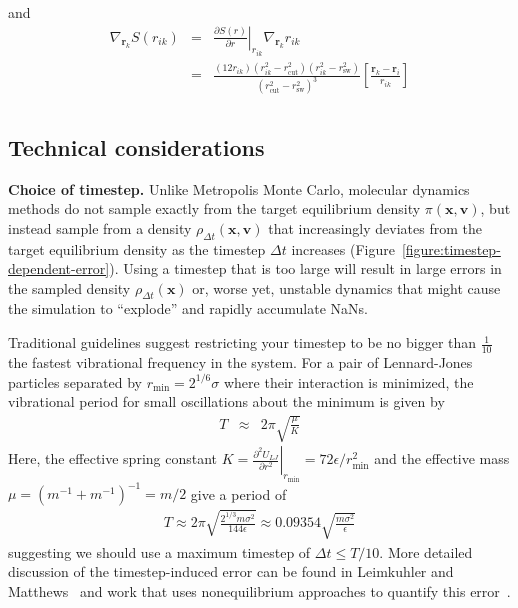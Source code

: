 \documentclass[aip,jcp,preprint,superscriptaddress,floatfix]{revtex4-1}
\newcommand{\x}{\mathbf{x}}
\newcommand{\vel}{\mathbf{v}}
\begin{document}
and
\begin{eqnarray}
\nabla_{\mathbf{r}_k} S(r_{ik}) &=& \left. \frac{\partial S(r)}{\partial r} \right|_{r_{ik}} \nabla_{\mathbf{r}_k} r_{ik}  \\
&=&\frac{(12 r_{ik}) (r_{ik}^2 - r_\mathrm{cut}^2) (r_{ik}^2 - r_\mathrm{sw}^2)}{(r_\mathrm{cut}^2 - r_\mathrm{sw}^2)^3} \left[ \frac{\mathbf{r}_k - \mathbf{r}_i}{r_{ik}} \right] \\
\end{eqnarray}

\subsection{Technical considerations}


\textbf{Choice of timestep.} 
Unlike Metropolis Monte Carlo, molecular dynamics methods do not sample exactly from the target equilibrium density $\pi(\x,\vel)$, but instead sample from a density $\rho_{\Delta t}(\x,\vel)$ that increasingly deviates from the target equilibrium density as the timestep $\Delta t$ increases (Figure~\ref{figure:timestep-dependent-error}).
Using a timestep that is too large will result in large errors in the sampled density $\rho_{\Delta t}(\x)$ or, worse yet, unstable dynamics that might cause the simulation to ``explode''  and rapidly accumulate NaNs.

Traditional guidelines suggest restricting your timestep to be no bigger than $\frac{1}{10}$ the fastest vibrational frequency in the system.
For a pair of Lennard-Jones particles separated by $r_\mathrm{min} = 2^{1/6} \sigma$ where their interaction is minimized, the vibrational period for small oscillations about the minimum is given by
\begin{eqnarray}
T &\approx& 2 \pi \sqrt{ \frac{\mu}{K} } 
\end{eqnarray}
Here, the effective spring constant $K = \left. \frac{\partial^2 U_{LJ}}{\partial r^2} \right|_{r_\mathrm{min}} = 72 \epsilon / r_\mathrm{min}^2$ and the effective mass $\mu = (m^{-1} + m^{-1})^{-1} = m/2$ give a period of 
\begin{eqnarray}
T \approx 2 \pi \sqrt{\frac{2^{1/3} m \sigma^2}{144 \epsilon}} \approx 0.09354 \sqrt{\frac{m \sigma^2}{\epsilon}}
\end{eqnarray}
suggesting we should use a maximum timestep of $\Delta t \le T/10$.
More detailed discussion of the timestep-induced error can be found in Leimkuhler and Matthews~\cite{LeimkuhlerMatthewsBook} and work that uses nonequilibrium approaches to quantify this error~\cite{VVVR}.
\end{document}
